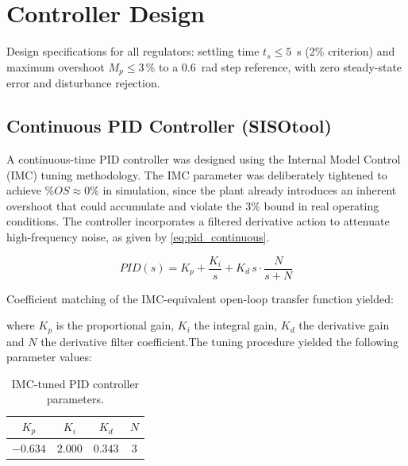 \documentclass[conference]{IEEEtran}
\begin{document}
\section{Controller Design}
\label{sec:ctrl}

Design specifications for all regulators: settling time $t_s \leq 5$~s (2\% criterion) and maximum overshoot $M_p \leq 3\,\%$ to a 0.6~rad step reference, with zero steady-state error and disturbance rejection.
\subsection{Continuous PID Controller (SISOtool)}
A continuous-time PID controller was designed using the Internal Model Control (IMC) tuning
methodology. The IMC parameter was deliberately tightened to achieve $\%OS \approx 0\%$ in
simulation, since the plant already introduces an inherent overshoot that could accumulate and
violate the $3\%$ bound in real operating conditions. The controller incorporates a filtered
derivative action to attenuate high-frequency noise, as given by \eqref{eq:pid_continuous}.


\begin{equation}
PID(s) = K_p + \frac{K_i}{s} + K_d\, s \cdot \frac{N}{s + N}
\label{eq:pid_continuous}
\end{equation}

Coefficient matching of the IMC-equivalent open-loop
transfer function yielded:

\noindent where $K_p$ is the proportional gain, $K_i$ the integral gain, $K_d$ the derivative gain and $N$ the derivative filter coefficient.The tuning procedure yielded the following parameter values:


\begin{table}[H]
  \centering
  \caption{IMC-tuned PID controller parameters.}
  \label{tab:pid_params}
  \begin{tabular}{cccc}
    \hline
    $K_p$ & $K_i$ & $K_d$ & $N$ \\
    \hline
    $-0.634$ & $2.000$ & $0.343$ & $3$ \\
    \hline
  \end{tabular}
\end{table}
\end{document}
